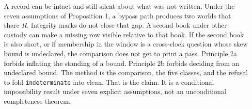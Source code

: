 \documentclass[11pt]{article}
\begin{document}
A record can be intact and still silent about what was not written. Under the seven assumptions of Proposition 1, a bypass path produces two worlds that share $R$. Integrity marks do not close that gap. A second book under other custody can make a missing row visible relative to that book. If the second book is also short, or if membership in the window is a cross-clock question whose skew bound is undeclared, the comparison does not get to print a pass. Principle 2a forbids inflating the standing of a bound. Principle 2b forbids deciding from an undeclared bound. The method is the comparison, the five classes, and the refusal to fold \texttt{indeterminate} into clean. That is the claim. It is a conditional impossibility result under seven explicit assumptions, not an unconditional completeness theorem.



\end{document}

